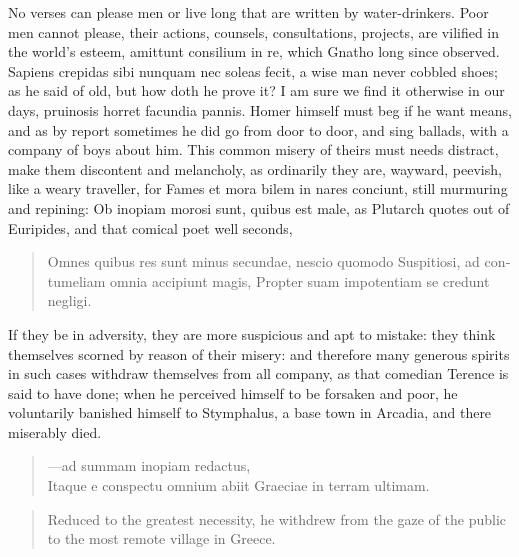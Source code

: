 {No verses can please men or live long that are written by
water-drinkers. Poor men cannot please, their actions, counsels,
consultations, projects, are vilified in the world's esteem, amittunt
consilium in re, which Gnatho long since observed. Sapiens
crepidas sibi nunquam nec soleas fecit, a wise man never cobbled shoes;
as he said of old, but how doth he prove it? I am sure we find it
otherwise in our days,  pruinosis horret facundia pannis. Homer
himself must beg if he want means, and as by report sometimes he did
go from door to door, and sing ballads, with a company of boys
about him. This common misery of theirs must needs distract, make them
discontent and melancholy, as ordinarily they are, wayward, peevish,
like a weary traveller, for  Fames et mora bilem in nares
conciunt, still murmuring and repining: Ob inopiam morosi sunt, quibus
est male, as Plutarch quotes out of Euripides, and that comical poet
well seconds,

\begin{latin}
\begin{quote}
Omnes quibus res sunt minus secundae, nescio quomodo
Suspitiosi, ad contumeliam omnia accipiunt magis,
Propter suam impotentiam se credunt negligi.
\end{quote}
\end{latin}

If they be in adversity, they are more suspicious and apt to mistake:
they think themselves scorned by reason of their misery: and therefore
many generous spirits in such cases withdraw themselves from all
company, as that comedian Terence is said to have done; when he
perceived himself to be forsaken and poor, he voluntarily banished
himself to Stymphalus, a base town in Arcadia, and there miserably
died.
%
\begin{latin}
\begin{quote}
---ad summam inopiam redactus,\\
Itaque e conspectu omnium abiit Graeciae in terram ultimam.
\end{quote}
\end{latin}
\translationrule
\begin{quote}%
Reduced to the greatest necessity, he withdrew from the gaze of the public to the most remote village in Greece.
\end{quote}

}
